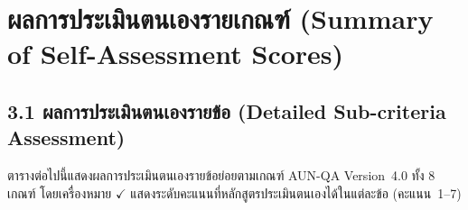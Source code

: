 
\section*{ผลการประเมินตนเองรายเกณฑ์ (Summary of Self-Assessment Scores)}

\subsection*{3.1 ผลการประเมินตนเองรายข้อ (Detailed Sub-criteria Assessment)}

ตารางต่อไปนี้แสดงผลการประเมินตนเองรายข้อย่อยตามเกณฑ์ AUN-QA Version~4.0 ทั้ง 8 เกณฑ์ โดยเครื่องหมาย $\checkmark$ แสดงระดับคะแนนที่หลักสูตรประเมินตนเองได้ในแต่ละข้อ (คะแนน~1--7)

